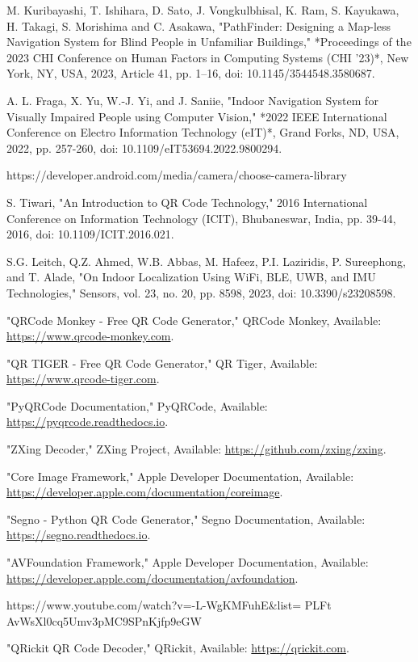 \begin{thebibliography}{9}
	M. Kuribayashi, T. Ishihara, D. Sato, J. Vongkulbhisal, K. Ram, S. Kayukawa, H. Takagi, S. Morishima and C. Asakawa, "PathFinder: Designing a Map-less Navigation System for Blind People in Unfamiliar Buildings," *Proceedings of the 2023 CHI Conference on Human Factors in Computing Systems (CHI '23)*, New York, NY, USA, 2023, Article 41, pp. 1–16, doi: 10.1145/3544548.3580687.
	
	A. L. Fraga, X. Yu, W.-J. Yi, and J. Saniie, "Indoor Navigation System for Visually Impaired People using Computer Vision," *2022 IEEE International Conference on Electro Information Technology (eIT)*, Grand Forks, ND, USA, 2022, pp. 257-260, doi: 10.1109/eIT53694.2022.9800294.
	
	https://developer.android.com/media/camera/choose-camera-library
	
	S. Tiwari, "An Introduction to QR Code Technology," 2016 International Conference on Information Technology (ICIT), Bhubaneswar, India, pp. 39-44, 2016, doi: 10.1109/ICIT.2016.021.
	
	 S.G. Leitch, Q.Z. Ahmed, W.B. Abbas, M. Hafeez, P.I. Laziridis, P. Sureephong, and T. Alade, "On Indoor Localization Using WiFi, BLE, UWB, and IMU Technologies," Sensors, vol. 23, no. 20, pp. 8598, 2023, doi: 10.3390/s23208598.
	
	 "QRCode Monkey - Free QR Code Generator," QRCode Monkey, Available: \url{https://www.qrcode-monkey.com}.
	
	 "QR TIGER - Free QR Code Generator," QR Tiger, Available: \url{https://www.qrcode-tiger.com}.
	
	
	 "PyQRCode Documentation," PyQRCode, Available: \url{https://pyqrcode.readthedocs.io}.

	 "ZXing Decoder," ZXing Project, Available: \url{https://github.com/zxing/zxing}.

	 "Core Image Framework," Apple Developer Documentation, Available: \url{https://developer.apple.com/documentation/coreimage}.

	 "Segno - Python QR Code Generator," Segno Documentation, Available: \url{https://segno.readthedocs.io}.

	 "AVFoundation Framework," Apple Developer Documentation, Available: \url{https://developer.apple.com/documentation/avfoundation}.

	https://www.youtube.com/watch?v=-L-WgKMFuhE\&list=
	PLFt AvWsXl0cq5Umv3pMC9SPnKjfp9eGW

	 "QRickit QR Code Decoder," QRickit, Available: \url{https://qrickit.com}.
\end{thebibliography}